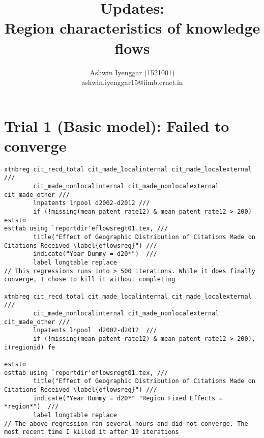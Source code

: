 \documentclass[12pt]{article}
\begin{document}
\title{Updates:\\ Region characteristics of knowledge flows}
\author{Ashwin Iyenggar  (1521001) \\ ashwin.iyenggar15@iimb.ernet.in} 


\maketitle
\thispagestyle{empty}

\section{Trial 1 (Basic model): Failed to converge }
\begin{lstlisting}
xtnbreg cit_recd_total cit_made_localinternal cit_made_localexternal ///
		cit_made_nonlocalinternal cit_made_nonlocalexternal  cit_made_other ///
		lnpatents lnpool d2002-d2012 ///
		if (!missing(mean_patent_rate12) & mean_patent_rate12 > 200)
eststo
esttab using `reportdir'eflowsregt01.tex, ///
		title("Effect of Geographic Distribution of Citations Made on Citations Received \label{eflowsreg}") ///
		indicate("Year Dummy = d20*")  ///
		label longtable replace
// This regressions runs into > 500 iterations. While it does finally converge, I chose to kill it without completing

xtnbreg cit_recd_total cit_made_localinternal cit_made_localexternal /// 
		cit_made_nonlocalinternal cit_made_nonlocalexternal cit_made_other ///
		lnpatents lnpool  d2002-d2012  ///
		if (!missing(mean_patent_rate12) & mean_patent_rate12 > 200), i(regionid) fe

eststo
esttab using `reportdir'eflowsregt01.tex, ///
		title("Effect of Geographic Distribution of Citations Made on Citations Received \label{eflowsreg}") ///
		indicate("Year Dummy = d20*" "Region Fixed Effects = *region*")  ///
		label longtable replace
// The above regression ran several hours and did not converge. The most recent time I killed it after 19 iterations
\end{lstlisting}
%
\end{document}
